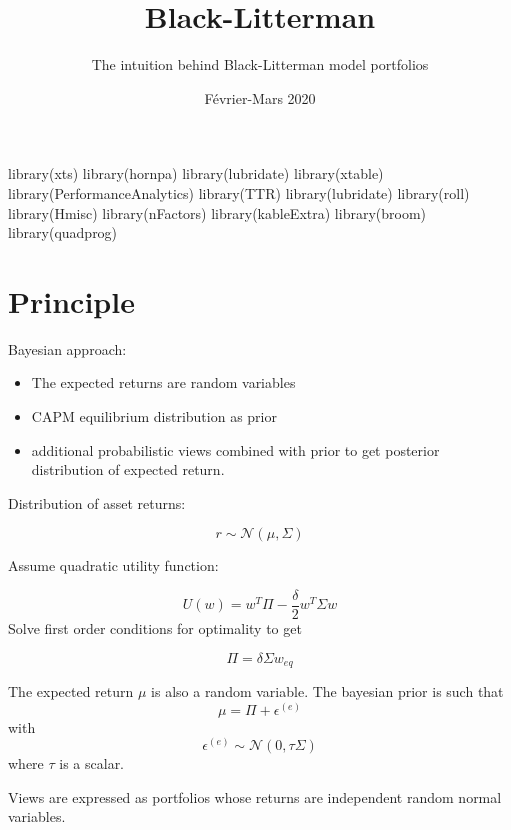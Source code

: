 \documentclass[
]{article}
\title{Black-Litterman}
\subtitle{The intuition behind Black-Litterman model portfolios}
\author{}
\date{\vspace{-2.5em}Février-Mars 2020}
\newenvironment{Shaded}{\begin{snugshade}}{\end{snugshade}}
\newcommand{\FunctionTok}[1]{\textcolor[rgb]{0.00,0.00,0.00}{#1}}
\newcommand{\NormalTok}[1]{#1}
\providecommand{\tightlist}{%
  \setlength{\itemsep}{0pt}\setlength{\parskip}{0pt}}
\begin{document}
\maketitle

\begin{Shaded}
\begin{Highlighting}[]
\FunctionTok{library}\NormalTok{(xts)}
\FunctionTok{library}\NormalTok{(hornpa)}
\FunctionTok{library}\NormalTok{(lubridate)}
\FunctionTok{library}\NormalTok{(xtable)}
\FunctionTok{library}\NormalTok{(PerformanceAnalytics)}
\FunctionTok{library}\NormalTok{(TTR)}
\FunctionTok{library}\NormalTok{(lubridate)}
\FunctionTok{library}\NormalTok{(roll)}
\FunctionTok{library}\NormalTok{(Hmisc)}
\FunctionTok{library}\NormalTok{(nFactors)}
\FunctionTok{library}\NormalTok{(kableExtra)}
\FunctionTok{library}\NormalTok{(broom)}
\FunctionTok{library}\NormalTok{(quadprog)}
\end{Highlighting}
\end{Shaded}

\hypertarget{principle}{%
\section{Principle}\label{principle}}

Bayesian approach:

\begin{itemize}
\tightlist
\item
  The expected returns are random variables
\item
  CAPM equilibrium distribution as prior
\item
  additional probabilistic views combined with prior to get posterior
  distribution of expected return.
\end{itemize}

Distribution of asset returns:

\[
r \sim \mathcal{N}(\mu, \Sigma)
\]

Assume quadratic utility function:

\[
U(w) = w^T \Pi - \frac{\delta}{2} w^T \Sigma w
\] Solve first order conditions for optimality to get

\[
\Pi = \delta \Sigma w_{eq}
\]

The expected return \(\mu\) is also a random variable. The bayesian
prior is such that \[
\mu = \Pi + \epsilon^{(e)}
\] with \[
\epsilon^{(e)} \sim \mathcal{N}(0, \tau \Sigma)
\] where \(\tau\) is a scalar.

Views are expressed as portfolios whose returns are independent random
normal variables.
\end{document}
